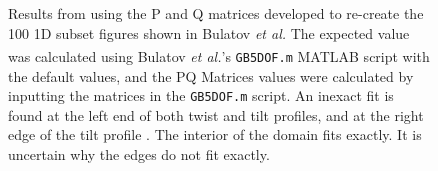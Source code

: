 \documentclass[12pt]{report}
\begin{document}
\begin{figure}[ht!]
 \caption{\label{fig:reproduceBulatov100} Results from using the P and Q matrices developed to re-create the \textlangle{}100\textrangle{} 1D subset figures shown in Bulatov \emph{et al.}  The expected value was calculated using Bulatov \emph{et al.}'s \lstinline!GB5DOF.m! MATLAB\textsuperscript{\textregistered} script with the default values, and the PQ Matrices values were calculated by inputting the matrices in the \lstinline!GB5DOF.m! script.  An inexact fit is found at the left end of both twist \protect{} and tilt \protect{} profiles, and at the right edge of the tilt profile \protect{}.  The interior of the domain fits exactly.  It is uncertain why the edges do not fit exactly.}
\end{figure}
\end{document}
